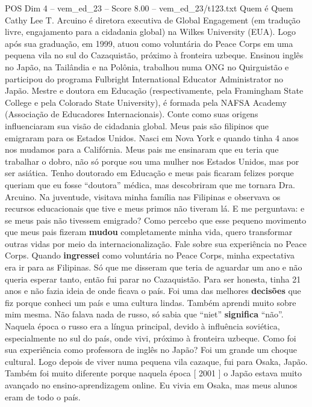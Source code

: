 \begin{textsample}{POS Dim 4 – vem\_ed\_23 – Score 8.00 – vem\_ed\_23/t123.txt}  \label{ex:f4_pos_088}
Quem é Quem Cathy Lee T.
Arcuino é diretora executiva de Global Engagement (em tradução livre, engajamento para a cidadania global) na Wilkes University (EUA).
Logo após sua graduação, em 1999, atuou como voluntária do Peace Corps em uma pequena vila no sul do Cazaquistão, próximo à fronteira uzbeque.
Ensinou inglês no Japão, na Tailândia e na Polônia, trabalhou numa ONG no Quirguistão e participou do programa Fulbright International Educator Administrator no Japão.
Mestre e doutora em Educação (respectivamente, pela Framingham State College e pela Colorado State University), é formada pela NAFSA Academy (Associação de Educadores Internacionais).
Conte como suas origens influenciaram sua visão de cidadania global.
Meus pais são filipinos que emigraram para os Estados Unidos.
Nasci em Nova York e quando tinha 4 anos nos mudamos para a Califórnia.
Meus pais me ensinaram que eu teria que trabalhar o dobro, não só porque sou uma mulher nos Estados Unidos, mas por ser asiática.
Tenho doutorado em Educação e meus pais ficaram felizes porque queriam que eu fosse “doutora” médica, mas descobriram que me tornara Dra.
Arcuino.
Na juventude, visitava minha família nas Filipinas e observava os recursos educacionais que tive e meus primos não tiveram lá.
E me perguntava: e se meus pais não tivessem emigrado?
Como percebo que esse pequeno movimento que meus pais fizeram \textbf{mudou} completamente minha vida, quero transformar outras vidas por meio da internacionalização.
Fale sobre sua experiência no Peace Corps.
Quando \textbf{ingressei} como voluntária no Peace Corps, minha expectativa era ir para as Filipinas.
Só que me disseram que teria de aguardar um ano e não queria esperar tanto, então fui parar no Cazaquistão.
Para ser honesta, tinha 21 anos e não fazia ideia de onde ficava o país.
Foi uma das melhores \textbf{decisões} que fiz porque conheci um país e uma cultura lindas.
Também aprendi muito sobre mim mesma.
Não falava nada de russo, só sabia que “niet” \textbf{significa} “não”.
Naquela época o russo era a língua principal, devido à influência soviética, especialmente no sul do país, onde vivi, próximo à fronteira uzbeque.
Como foi sua experiência como professora de inglês no Japão?
Foi um grande um choque cultural.
Logo depois de viver numa pequena vila cazaque, fui para Osaka, Japão.
Também foi muito diferente porque naquela época [ 2001 ] o Japão estava muito avançado no ensino-aprendizagem online.
Eu vivia em Osaka, mas meus alunos eram de todo o país.

\end{textsample}
